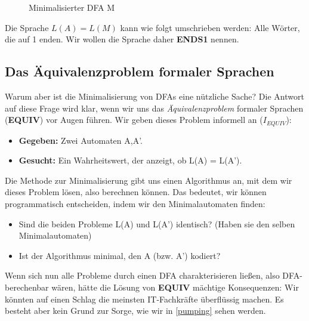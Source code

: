 \begin{figure}[ht] %
\centering %
\caption{Minimalisierter DFA M}
\label{fig:mindfa}
\end{figure}

Die Sprache $L(A) = L(M)$ kann wie folgt umschrieben werden:
Alle Wörter, die auf 1 enden.
Wir wollen die Sprache daher \textbf{ENDS1} nennen.

\subsection{Das Äquivalenzproblem formaler Sprachen}

Warum aber ist die Minimalisierung von DFAs eine nützliche Sache? 
Die Antwort auf diese Frage wird klar,
wenn wir uns das \emph{Äquivalenzproblem} formaler Sprachen (\textbf{EQUIV})
vor Augen führen.
Wir geben dieses Problem informell an ($I_{EQUIV}$):
\begin{itemize}
    \item \textbf{Gegeben:} Zwei Automaten A,A'.
    \item \textbf{Gesucht:} Ein Wahrheitswert, der anzeigt, ob L(A) = L(A').
\end{itemize}
Die Methode zur Minimalisierung gibt uns einen Algorithmus an,
mit dem wir dieses Problem lösen, also berechnen können.
Das bedeutet, wir können programmatisch entscheiden,
indem wir den Minimalautomaten finden:
\begin{itemize}
    \item Sind die beiden Probleme L(A) und L(A') identisch?
        (Haben sie den selben Minimalautomaten)
    \item Ist der Algorithmus minimal, den A (bzw. A') kodiert?
\end{itemize}

Wenn sich nun alle Probleme durch einen DFA charakterisieren ließen,
also DFA-berechenbar wären,
hätte die Lösung von \textbf{EQUIV} mächtige Konsequenzen:
Wir könnten auf einen Schlag die meinsten IT-Fachkräfte überflüssig machen.
Es besteht aber kein Grund zur Sorge, wie wir in \autoref{pumping} sehen werden.

